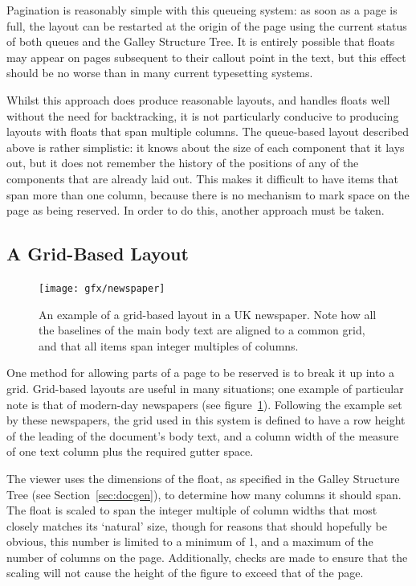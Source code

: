 Pagination is reasonably simple with this queueing system: as soon as a page is full, the layout can be restarted at the origin of the page using the current status of both queues and the Galley Structure Tree. It is entirely possible that floats may appear on pages subsequent to their callout point in the text, but this effect should be no worse than in many current typesetting systems.

Whilst this approach does produce reasonable layouts, and handles floats well without the need for backtracking, it is not particularly conducive to producing layouts with floats that span multiple columns. The queue-based layout described above is rather simplistic: it knows about the size of each component that it lays out, but it does not remember the history of the positions of any of the components that are already laid out. This makes it difficult to have items that span more than one column, because there is no mechanism to mark space on the page as being reserved. In order to do this, another approach must be taken.

\subsection{A Grid-Based Layout}
\label{sec:gridlayout}

\begin{figure}
    \texttt{[image: gfx/newspaper]}
    \caption[An example of a grid-based layout]{An example of a grid-based layout in a UK newspaper. Note how all the baselines of the main body text are aligned to a common grid, and that all items span integer multiples of columns.}
    \label{fig:gridlayout}
\end{figure}

One method for allowing parts of a page to be reserved is to break it up into a grid. Grid-based layouts are useful in many situations;\cite{Collier1991,Bringhurst2008} one example of particular note is that of modern-day newspapers (see figure~\ref{fig:gridlayout}). Following the example set by these newspapers, the grid used in this system is defined to have a row height of the \gls{leading} of the document's body text, and a column width of the \gls{measure} of one text column plus the required gutter space.



The viewer uses the dimensions of the float, as specified in the Galley Structure Tree (see Section~\ref{sec:docgen}), to determine how many columns it should span. The float is scaled to span the integer multiple of column widths that most closely matches its `natural' size, though for reasons that should hopefully be obvious, this number is limited to a minimum of 1, and a maximum of the number of columns on the page. Additionally, checks are made to ensure that the scaling will not cause the height of the figure to exceed that of the page.

